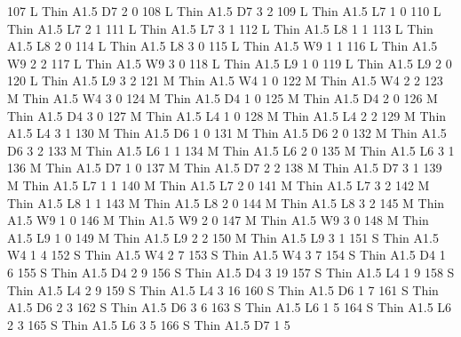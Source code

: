 \documentclass{article}
\begin{document}
\begin{Schunk}
\begin{Soutput}
107       L   Thin A1.5      D7     2     0
108       L   Thin A1.5      D7     3     2
109       L   Thin A1.5      L7     1     0
110       L   Thin A1.5      L7     2     1
111       L   Thin A1.5      L7     3     1
112       L   Thin A1.5      L8     1     1
113       L   Thin A1.5      L8     2     0
114       L   Thin A1.5      L8     3     0
115       L   Thin A1.5      W9     1     1
116       L   Thin A1.5      W9     2     2
117       L   Thin A1.5      W9     3     0
118       L   Thin A1.5      L9     1     0
119       L   Thin A1.5      L9     2     0
120       L   Thin A1.5      L9     3     2
121       M   Thin A1.5      W4     1     0
122       M   Thin A1.5      W4     2     2
123       M   Thin A1.5      W4     3     0
124       M   Thin A1.5      D4     1     0
125       M   Thin A1.5      D4     2     0
126       M   Thin A1.5      D4     3     0
127       M   Thin A1.5      L4     1     0
128       M   Thin A1.5      L4     2     2
129       M   Thin A1.5      L4     3     1
130       M   Thin A1.5      D6     1     0
131       M   Thin A1.5      D6     2     0
132       M   Thin A1.5      D6     3     2
133       M   Thin A1.5      L6     1     1
134       M   Thin A1.5      L6     2     0
135       M   Thin A1.5      L6     3     1
136       M   Thin A1.5      D7     1     0
137       M   Thin A1.5      D7     2     2
138       M   Thin A1.5      D7     3     1
139       M   Thin A1.5      L7     1     1
140       M   Thin A1.5      L7     2     0
141       M   Thin A1.5      L7     3     2
142       M   Thin A1.5      L8     1     1
143       M   Thin A1.5      L8     2     0
144       M   Thin A1.5      L8     3     2
145       M   Thin A1.5      W9     1     0
146       M   Thin A1.5      W9     2     0
147       M   Thin A1.5      W9     3     0
148       M   Thin A1.5      L9     1     0
149       M   Thin A1.5      L9     2     2
150       M   Thin A1.5      L9     3     1
151       S   Thin A1.5      W4     1     4
152       S   Thin A1.5      W4     2     7
153       S   Thin A1.5      W4     3     7
154       S   Thin A1.5      D4     1     6
155       S   Thin A1.5      D4     2     9
156       S   Thin A1.5      D4     3    19
157       S   Thin A1.5      L4     1     9
158       S   Thin A1.5      L4     2     9
159       S   Thin A1.5      L4     3    16
160       S   Thin A1.5      D6     1     7
161       S   Thin A1.5      D6     2     3
162       S   Thin A1.5      D6     3     6
163       S   Thin A1.5      L6     1     5
164       S   Thin A1.5      L6     2     3
165       S   Thin A1.5      L6     3     5
166       S   Thin A1.5      D7     1     5

\end{Soutput}
\end{Schunk}
\end{document}
